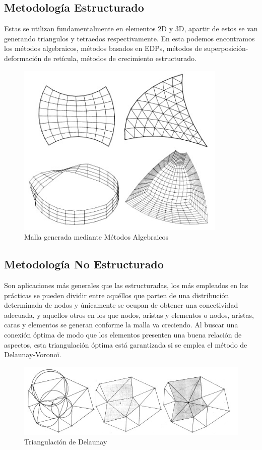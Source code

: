 \documentclass{article}
\begin{document}
\subsection{Metodología Estructurado}
Estas se utilizan fundamentalmente en elementos 2D y 3D, apartir de estos se van generando triangulos y tetraedos respectivamente. En esta podemos encontramos los métodos algebraicos, métodos basados en EDPs, métodos de superposición-deformación de retícula, métodos de crecimiento estructurado. \cite{alejandro2000metodos,Byron2014optimzacion}

\begin{figure}[h!]
\centering
\includegraphics[width=10cm]{MallaAlgebraica}
\caption{Malla generada mediante Métodos Algebraicos}
\label{fig:Malla Algebraica}
\end{figure}

\subsection{Metodología No Estructurado}
Son aplicaciones más generales que las estructuradas, los más empleados en las prácticas se pueden dividir entre aquéllos que parten de una distribución determinada de nodos y únicamente se ocupan de obtener una conectividad adecuada, y aquellos otros en los que nodos, aristas y elementos o nodos, aristas, caras y elementos se generan conforme la malla va creciendo. Al buscar una conexión óptima de modo que los elementos presenten una buena relación de aspectos, esta triangulación óptima está garantizada si se emplea el método de Delaunay-Voronoï. \cite{alejandro2000metodos}

\begin{figure}[h!]
\centering
\includegraphics[width=12cm]{MallaDelaunay-Voronoi}
\caption{Triangulación de Delaunay}
\label{fig:Malla Delaunay}
\end{figure}
\end{document}

